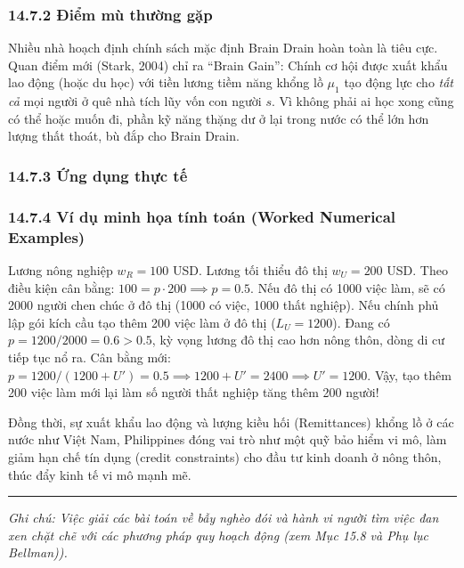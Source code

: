\documentclass[
]{article}
\begin{document}
\subsubsection{14.7.2 Điểm mù thường
gặp}\label{ux111iux1ec3m-muxf9-thux1b0ux1eddng-gux1eb7p-12}

Nhiều nhà hoạch định chính sách mặc định Brain Drain hoàn toàn là tiêu
cực. Quan điểm mới (Stark, 2004) chỉ ra ``Brain Gain'': Chính cơ hội
được xuất khẩu lao động (hoặc du học) với tiền lương tiềm năng khổng lồ
\(\mu_1\) tạo động lực cho \emph{tất cả} mọi người ở quê nhà tích lũy
vốn con người \(s\). Vì không phải ai học xong cũng có thể hoặc muốn đi,
phần kỹ năng thặng dư ở lại trong nước có thể lớn hơn lượng thất thoát,
bù đắp cho Brain Drain.

\subsubsection{14.7.3 Ứng dụng thực
tế}\label{ux1ee9ng-dux1ee5ng-thux1ef1c-tux1ebf-6}

\subsubsection{14.7.4 Ví dụ minh họa tính toán (Worked Numerical
Examples)}\label{vuxed-dux1ee5-minh-hux1ecda-tuxednh-touxe1n-worked-numerical-examples-43}

Lương nông nghiệp \(w_R = 100\) USD. Lương tối thiểu đô thị
\(w_U = 200\) USD. Theo điều kiện cân bằng:
\(100 = p \cdot 200 \implies p = 0.5\). Nếu đô thị có 1000 việc làm, sẽ
có 2000 người chen chúc ở đô thị (1000 có việc, 1000 thất nghiệp). Nếu
chính phủ lập gói kích cầu tạo thêm 200 việc làm ở đô thị
(\(L_U = 1200\)). Đang có \(p = 1200 / 2000 = 0.6 > 0.5\), kỳ vọng lương
đô thị cao hơn nông thôn, dòng di cư tiếp tục nổ ra. Cân bằng mới:
\(p = 1200 / (1200 + U') = 0.5 \implies 1200 + U' = 2400 \implies U' = 1200\).
Vậy, tạo thêm 200 việc làm mới lại làm số người thất nghiệp tăng thêm
200 người!

Đồng thời, sự xuất khẩu lao động và lượng kiều hối (Remittances) khổng
lồ ở các nước như Việt Nam, Philippines đóng vai trò như một quỹ bảo
hiểm vi mô, làm giảm hạn chế tín dụng (credit constraints) cho đầu tư
kinh doanh ở nông thôn, thúc đẩy kinh tế vi mô mạnh mẽ.

\begin{center}\rule{0.5\linewidth}{0.5pt}\end{center}

\emph{Ghi chú: Việc giải các bài toán về bẫy nghèo đói và hành vi người
tìm việc đan xen chặt chẽ với các phương pháp quy hoạch động (xem Mục
15.8 và Phụ lục Bellman)).}
\end{document}
